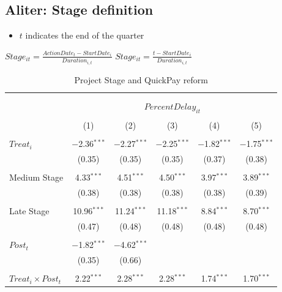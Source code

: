 \documentclass[
]{article}
\providecommand{\tightlist}{%
  \setlength{\itemsep}{0pt}\setlength{\parskip}{0pt}}
\begin{document}
\hypertarget{aliter-stage-definition}{%
\subsection{Aliter: Stage definition}\label{aliter-stage-definition}}

\begin{itemize}
\tightlist
\item
  \(t\) indicates the end of the quarter
\end{itemize}

\(Stage_{it}=\frac{ActionDate_{t}-StartDate_i}{Duration_{i,t}}\)
\(Stage_{it}=\frac{t-StartDate_i}{Duration_{i,t}}\)

\begin{table}[H] \centering 
  \caption{Project Stage and QuickPay reform} 
  \label{} 
\small 
\begin{tabular}{@{\extracolsep{-2pt}}lccccc} 
\\[-1.8ex]\hline 
\hline \\[-1.8ex] 
\\[-1.8ex] & \multicolumn{5}{c}{$PercentDelay_{it}$  } \\ 
\\[-1.8ex] & (1) & (2) & (3) & (4) & (5)\\ 
\hline \\[-1.8ex] 
 $Treat_i$ & $-$2.36$^{***}$ & $-$2.27$^{***}$ & $-$2.25$^{***}$ & $-$1.82$^{***}$ & $-$1.75$^{***}$ \\ 
  & (0.35) & (0.35) & (0.35) & (0.37) & (0.38) \\ 
  & & & & & \\ 
 Medium Stage & 4.33$^{***}$ & 4.51$^{***}$ & 4.50$^{***}$ & 3.97$^{***}$ & 3.89$^{***}$ \\ 
  & (0.38) & (0.38) & (0.38) & (0.38) & (0.39) \\ 
  & & & & & \\ 
 Late Stage & 10.96$^{***}$ & 11.24$^{***}$ & 11.18$^{***}$ & 8.84$^{***}$ & 8.70$^{***}$ \\ 
  & (0.47) & (0.48) & (0.48) & (0.48) & (0.48) \\ 
  & & & & & \\ 
 $Post_t$ & $-$1.82$^{***}$ & $-$4.62$^{***}$ &  &  &  \\ 
  & (0.35) & (0.66) &  &  &  \\ 
  & & & & & \\ 
 $Treat_i \times Post_t$ & 2.22$^{***}$ & 2.28$^{***}$ & 2.28$^{***}$ & 1.74$^{***}$ & 1.70$^{***}$ \\ 

\end{tabular}
\end{table}
\end{document}
